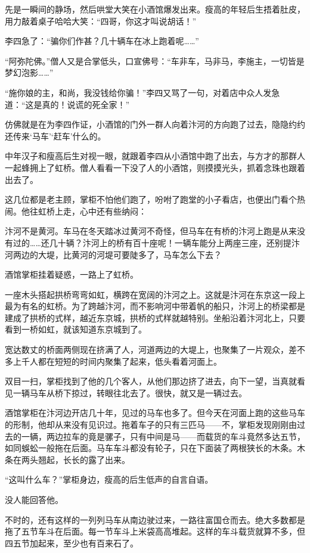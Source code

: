 先是一瞬间的静场，然后哄堂大笑在小酒馆爆发出来。瘦高的年轻后生捂着肚皮，用力敲着桌子哈哈大笑：“四哥，你这才叫说胡话！”

李四急了：“骗你们作甚？几十辆车在冰上跑着呢……”

“阿弥陀佛。”僧人又是合掌低头，口宣佛号：“车非车，马非马，李施主，一切皆是梦幻泡影……”

“施你娘的主，和尚，我没钱给你骗！”李四又骂了一句，对着店中众人发急道：“这是真的！说谎的死全家！”

仿佛就是在为李四作证，小酒馆的门外一群人向着汴河的方向跑了过去，隐隐约约还传来‘马车’‘赶车’什么的。

中年汉子和瘦高后生对视一眼，就跟着李四从小酒馆中跑了出去，与方才的那群人一起蜂拥上了虹桥。僧人看看一下没了人的小酒馆，则摸摸光头，抓着念珠也跟着出去了。

这几位都是老主顾，掌柜不怕他们跑了，吩咐了跑堂的小子看店，也便出门看个热闹。他往虹桥上走，心中还有些纳闷：

汴河不是黄河。车马在冬天踏冰过黄河不奇怪，但马车在有桥的汴河上跑是从来没有过的……还几十辆？汴河上的桥有百十座呢！一辆车能分上两座三座，还别提汴河两边的大堤，比黄河的河堤可要陡多了，马车怎么下去？

酒馆掌柜挂着疑惑，一路上了虹桥。

一座木头搭起拱桥弯弯如虹，横跨在宽阔的汴河之上。这就是汴河在东京这一段上最为有名的虹桥。为了跨越汴河，而不影响河中带着帆的船只，汴河上的桥梁都是建成了拱桥的式样，越近东京城，拱桥的式样就越特别。坐船沿着汴河北上，只要看到一桥如虹，就该知道东京城到了。

宽达数丈的桥面两侧现在挤满了人，河道两边的大堤上，也聚集了一片观众，差不多上千人都在短短的时间内聚集了起来，低头看着河面上。

双目一扫，掌柜找到了他的几个客人，从他们那边挤了进去，向下一望，当真就看见一辆马车从桥下掠过，转眼往北去了。很快，就又是一辆过去。

酒馆掌柜在汴河边开店几十年，见过的马车也多了。但今天在河面上跑的这些马车的形制，他却从来没有见识过。拖着车子的只有三匹马——不，掌柜发现刚刚由过去的一辆，两边拉车的竟是骡子，只有中间是马——而载货的车斗竟然多达五节，如同蜈蚣一般拖在后面。马车车斗都没有轮子，只在下面装了两根狭长的木条。木条在两头翘起，长长的露了出来。

“这叫什么车？”掌柜身边，瘦高的后生低声的自言自语。

没人能回答他。

不时的，还有这样的一列列马车从南边驶过来，一路往富国仓而去。绝大多数都是拖了五节车斗在后面。每一节车斗上米袋高高堆起。这样的车斗载货就算不多，但四五节加起来，至少也有百来石了。

